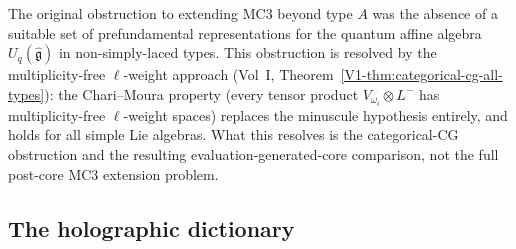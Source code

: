 \begin{remark}
The original obstruction to extending MC3 beyond type $A$ was the
absence of a suitable set of prefundamental representations for the
quantum affine algebra $U_q(\hat{\mathfrak{g}})$ in non-simply-laced
types. This obstruction is resolved by the
multiplicity-free $\ell$-weight approach
(Vol~I, Theorem~\ref*{V1-thm:categorical-cg-all-types}): the
Chari--Moura property (every tensor product $V_{\omega_i} \otimes L^-$
has multiplicity-free $\ell$-weight spaces) replaces the minuscule
hypothesis entirely, and holds for all simple Lie algebras. What this
resolves is the categorical-CG obstruction and the resulting
evaluation-generated-core comparison, not the full post-core MC3
extension problem.
\end{remark}


\subsection{The holographic dictionary}

